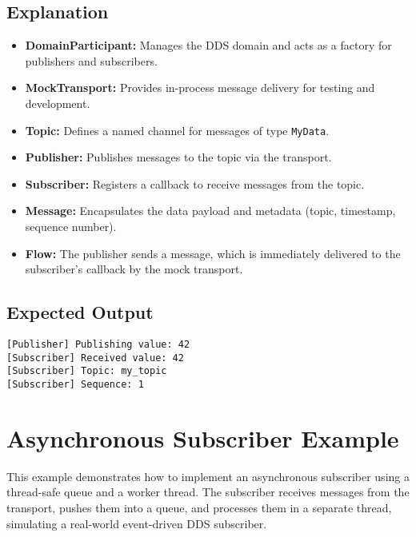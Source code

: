 \documentclass[12pt]{report}
\begin{document}
\subsection{Explanation}
\begin{itemize}
    \item \textbf{DomainParticipant:} Manages the DDS domain and acts as a factory for publishers and subscribers.
    \item \textbf{MockTransport:} Provides in-process message delivery for testing and development.
    \item \textbf{Topic:} Defines a named channel for messages of type \texttt{MyData}.
    \item \textbf{Publisher:} Publishes messages to the topic via the transport.
    \item \textbf{Subscriber:} Registers a callback to receive messages from the topic.
    \item \textbf{Message:} Encapsulates the data payload and metadata (topic, timestamp, sequence number).
    \item \textbf{Flow:} The publisher sends a message, which is immediately delivered to the subscriber's callback by the mock transport.
\end{itemize}

\subsection{Expected Output}
\begin{lstlisting}
[Publisher] Publishing value: 42
[Subscriber] Received value: 42
[Subscriber] Topic: my_topic
[Subscriber] Sequence: 1
\end{lstlisting}

\section{Asynchronous Subscriber Example}
This example demonstrates how to implement an asynchronous subscriber using a thread-safe queue and a worker thread. The subscriber receives messages from the transport, pushes them into a queue, and processes them in a separate thread, simulating a real-world event-driven DDS subscriber.
\end{document}
